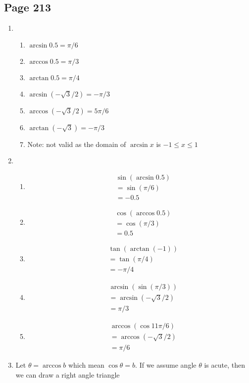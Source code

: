 \documentclass{article}
\newenvironment{solutions}[1]
{\subsection*{#1}
 \begin{enumerate}[leftmargin=1.5em]}
{\end{enumerate}}
\newcommand{\solution}{\item}
\newenvironment{subsolutions}
{\begin{enumerate}}
{\end{enumerate}}
\newcommand{\subsolution}{\item}
\begin{document}
\begin{solutions}{Page 213}
\solution
\begin{subsolutions}
    \subsolution $\arcsin 0.5 = \pi/6$
    \subsolution $\arccos 0.5 = \pi/3$
    \subsolution $\arctan 0.5 = \pi/4$
    \subsolution $\arcsin (-\sqrt{3}/2) = -\pi/3$
    \subsolution $\arccos (-\sqrt{3}/2) = 5\pi/6$
    \subsolution $\arctan (-\sqrt{3}) = -\pi/3$
    \subsolution Note: not valid as the domain of $\arcsin x$ is $-1 \leq x \leq 1$
\end{subsolutions}
\solution
\begin{subsolutions}
    \subsolution 
    \begin{align*}
        &\sin(\arcsin 0.5)\\
        &=\sin(\pi/6) \\
        &=-0.5
    \end{align*}
    \subsolution 
    \begin{align*}
        &\cos(\arccos 0.5)\\
        &=\cos(\pi/3)\\
        &= 0.5
    \end{align*}
    \subsolution 
    \begin{align*}
        &\tan(\arctan (-1))\\
        &=\tan(\pi/4)\\
        &= -\pi/4
    \end{align*}
    \subsolution 
    \begin{align*}
        &\arcsin(\sin (\pi/3))\\
        &=\arcsin(-\sqrt{3}/2)\\
        &= \pi/3
    \end{align*}
    \subsolution 
    \begin{align*}
        &\arccos (\cos 11\pi/6) \\
        &=\arccos(-\sqrt{3}/2)\\
        &= \pi/6
    \end{align*}
\end{subsolutions}
\solution
Let $\theta = \arccos b$ which mean $\cos \theta = b$. If we assume angle $\theta$ is acute, then we can draw a right angle triangle

    

\end{solutions}
\end{document}
